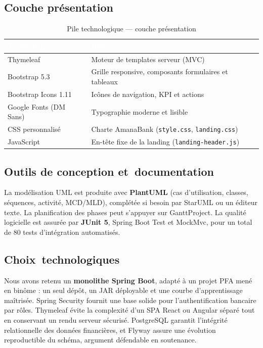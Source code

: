 \documentclass[11pt,a4paper,oneside]{report}
\newcommand{\tabhead}[1]{\textcolor{white}{\textbf{#1}}}
\begin{document}
\subsection{Couche présentation}

\begin{table}[H]
    \centering
    \caption{Pile technologique — couche présentation}
    \label{tab:stack-frontend}
    \begin{tabular}{@{}lp{9cm}@{}}
        \rowcolor{AmanaBrown}
        \tabhead{Technologie} & \tabhead{Rôle} \\
        \midrule
        Thymeleaf & Moteur de templates serveur (MVC) \\
        Bootstrap 5.3 & Grille responsive, composants formulaires et tableaux \\
        Bootstrap Icons 1.11 & Icônes de navigation, KPI et actions \\
        Google Fonts (DM Sans) & Typographie moderne et lisible \\
        CSS personnalisé & Charte AmanaBank (\texttt{style.css}, \texttt{landing.css}) \\
        JavaScript & En-tête fixe de la landing (\texttt{landing-header.js}) \\
        \bottomrule
    \end{tabular}
\end{table}

\subsection{Outils de conception et~documentation}

La modélisation UML est produite avec \textbf{PlantUML} (cas d'utilisation, classes, séquences, activité, MCD/MLD), complétée si besoin par StarUML ou un éditeur texte. La planification des phases peut s'appuyer sur GanttProject. La qualité logicielle est assurée par \textbf{JUnit 5}, Spring Boot Test et MockMvc, pour un total de 80 tests d'intégration automatisés.

\subsection{Choix~technologiques}

Nous avons retenu un \textbf{monolithe Spring Boot}, adapté à un projet PFA mené en binôme : un seul dépôt, un JAR déployable et une courbe d'apprentissage maîtrisée. Spring Security fournit une base solide pour l'authentification bancaire par rôles. Thymeleaf évite la complexité d'un SPA React ou Angular séparé tout en conservant un rendu serveur sécurisé. PostgreSQL garantit l'intégrité relationnelle des données financières, et Flyway assure une évolution reproductible du schéma, argument défendable en soutenance.
\end{document}
